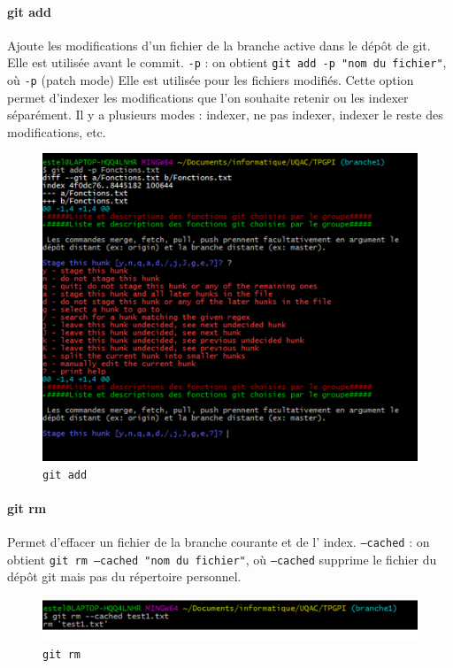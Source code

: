 \documentclass[11pt,canadien]{article}
\begin{document}
\paragraph{git add}Ajoute les modifications d’un fichier de la branche active dans le dépôt de git. Elle est utilisée avant le commit. \texttt{-p} : on obtient \texttt{git add -p "nom du fichier"}, où \texttt{-p} (patch mode) Elle est utilisée pour les fichiers modifiés. Cette option permet d’indexer les modifications que l’on souhaite retenir ou les indexer séparément. Il y a plusieurs modes : indexer, ne pas indexer, indexer le reste des modifications, etc.
\begin{figure}[h]
	\centering
	\includegraphics{images/git_add_-p}
	\caption{\texttt{git add}}
	\label{fig:git_add}
\end{figure}

\paragraph{git rm}Permet d’effacer un fichier de la branche courante et de l’ index. \texttt{--cached} : on obtient \texttt{git rm --cached "nom du fichier"}, où \texttt{--cached} supprime le fichier du dépôt git mais pas du répertoire personnel.
\begin{figure}[h]
	\centering
	\includegraphics{images/git_rm_--cached.png}
	\caption{\texttt{git rm}}
	\label{fig:git_rm}
\end{figure}
\end{document}
